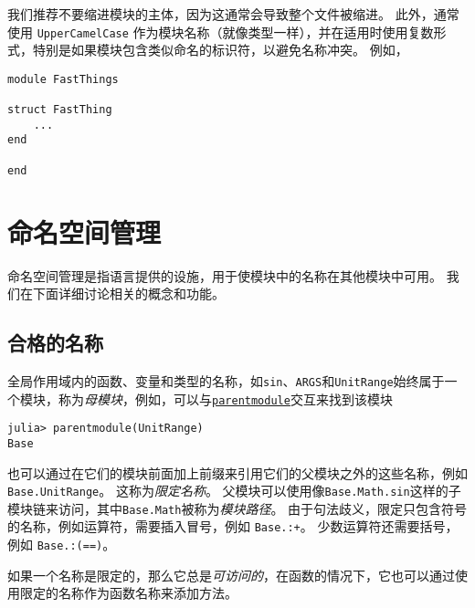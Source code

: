 我们推荐不要缩进模块的主体，因为这通常会导致整个文件被缩进。 此外，通常使用 \texttt{UpperCamelCase} 作为模块名称（就像类型一样），并在适用时使用复数形式，特别是如果模块包含类似命名的标识符，以避免名称冲突。 例如，




\begin{verbatim}
module FastThings

struct FastThing
    ...
end

end
\end{verbatim}



\hypertarget{7538295366457379059}{}


\section{命名空间管理}



命名空间管理是指语言提供的设施，用于使模块中的名称在其他模块中可用。 我们在下面详细讨论相关的概念和功能。



\hypertarget{14172365012073631390}{}


\subsection{合格的名称}



全局作用域内的函数、变量和类型的名称，如\texttt{sin}、\texttt{ARGS}和\texttt{UnitRange}始终属于一个模块，称为\emph{母模块}，例如，可以与\hyperlink{10164029261176394442}{\texttt{parentmodule}}交互来找到该模块




\begin{verbatim}
julia> parentmodule(UnitRange)
Base
\end{verbatim}



也可以通过在它们的模块前面加上前缀来引用它们的父模块之外的这些名称，例如\texttt{Base.UnitRange}。 这称为\emph{限定名称}。 父模块可以使用像\texttt{Base.Math.sin}这样的子模块链来访问，其中\texttt{Base.Math}被称为\emph{模块路径}。 由于句法歧义，限定只包含符号的名称，例如运算符，需要插入冒号，例如 \texttt{Base.:+}。 少数运算符还需要括号，例如 \texttt{Base.:(==)}。



如果一个名称是限定的，那么它总是\emph{可访问的}，在函数的情况下，它也可以通过使用限定的名称作为函数名称来添加方法。



